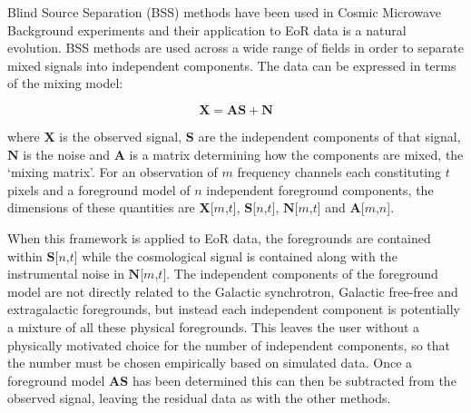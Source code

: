  Blind Source Separation (BSS) methods have been used in Cosmic Microwave Background experiments \cite{PlanckI2018arXiv180706205P,PlanckIV2018} and their application to EoR data is a natural evolution. BSS methods are used across a wide range of fields in order to separate mixed signals into independent components. The data can be expressed in terms of the mixing model:

\begin{equation}
\mathbf{X} = \mathbf{A}\mathbf{S} + \mathbf{N}
\end{equation}

\noindent where $\mathbf{X}$ is the observed signal, $\mathbf{S}$ are the independent components of that signal, $\mathbf{N}$ is the noise and $\mathbf{A}$ is a matrix determining how the components are mixed, the `mixing matrix'. For an observation of $m$ frequency channels each constituting $t$ pixels and a foreground model of $n$ independent foreground components, the dimensions of these quantities are $\mathbf{X}$[$m$,$t$], $\mathbf{S}$[$n$,$t$], $\mathbf{N}$[$m$,$t$] and $\mathbf{A}$[$m$,$n$].

When this framework is applied to EoR data, the foregrounds are contained within $\mathbf{S}$[$n$,$t$] while the cosmological signal is contained along with the instrumental noise in $\mathbf{N}$[$m$,$t$]. The independent components of the foreground model are not directly related to the Galactic synchrotron, Galactic free-free and extragalactic foregrounds, but instead each independent component is potentially a mixture of all these physical foregrounds. This leaves the user without a physically motivated choice for the number of independent components, so that the number must be chosen empirically based on simulated data. Once a foreground model $\mathbf{A}\mathbf{S}$ has been determined this can then be subtracted from the observed signal, leaving the residual data as with the other methods.


